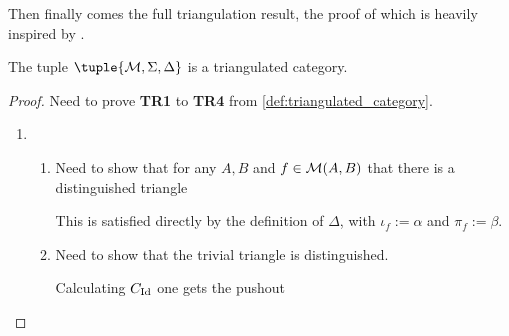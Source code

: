 
Then finally comes the full triangulation result, the proof of which is heavily inspired by \cite[First theorem in Chapter 1, Subsection 2.6]{Happel_1988}.

\begin{definition}
    The tuple \( \tuple{\Mc, \Sigma, \Delta} \) is a triangulated category.
\end{definition}
\begin{proof}
    Need to prove {\bf TR1} to {\bf TR4} from \autoref{def:triangulated_category}.

    \begin{enumerate}[label={(\bfseries T\arabic*)}]
        \item {
            \begin{enumerate}
                \item {
                    Need to show that for any \( A, B \) and \( f \in {\mathcal{M}}(A, B) \) that there is a distinguished triangle
                    \begin{center}
                    \end{center}

                    This is satisfied directly by the definition of \( \Delta \), with \( \iota_f := \alpha \) and \( \pi_f := \beta \).
                }
                \item {
                    Need to show that the trivial triangle is distinguished.

                    Calculating \( C_{\operatorname{Id}} \) one gets the pushout
                    \begin{center}
\end{center}}
\end{enumerate}}
\end{enumerate}
\end{proof}

